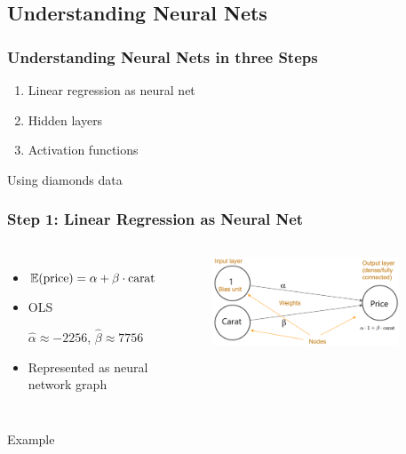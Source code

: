 \subsection{Understanding Neural Nets}

\begin{frame}
	\frametitle{Understanding Neural Nets in three Steps}
	\begin{enumerate}
		\item Linear regression as neural net
		\item Hidden layers
		\item Activation functions
	\end{enumerate}
	
	\vfill
	
	Using \alert{diamonds} data
\end{frame}

\begin{frame}
	\frametitle{Step 1: Linear Regression as Neural Net}
	\begin{columns}
		\begin{itemize}
			\item $\operatorname{\mathbb{E}}(\text{price})=\alpha+\beta \cdot \text{carat}$
			\item OLS 
			
			$\hat\alpha \approx -2256$, $\hat\beta \approx 7756$
			\item Represented as neural network graph
		\end{itemize}
		\begin{figure}
			\includegraphics[width=0.9\textwidth]{pics/simple_nn.png}
		\end{figure}
	\end{columns}
	
	\vfill
	
	\begin{exampleblock}{\centering Example}
	\end{exampleblock}
\end{frame}

